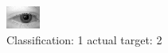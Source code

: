 \begin{figure}[h!]
\begin{center}
\includegraphics[width=0.60\columnwidth]{figures/ID479_class_1_target_2.png}
\end{center}
\caption{ Classification: 1 actual target: 2}
\label{fig:ID479_class_1_target_2}
\end{figure}

